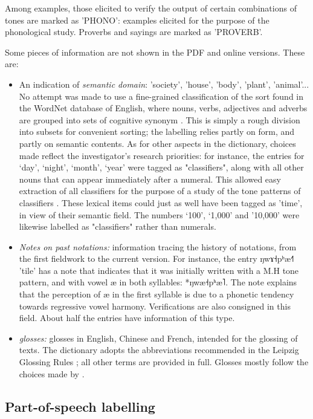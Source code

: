 \documentclass[oldfontcommands,oneside,a4paper,11pt]{article}
\newcommand{\ipa}[1]{{\phon #1}} %
\begin{document}
	Among examples, those elicited to verify the output of certain combinations of tones are marked as 'PHONO': examples elicited for the purpose of the phonological study. Proverbs and sayings are marked as 'PROVERB'.
	
	Some pieces of information are not shown in the PDF and online versions. These are:
	\begin{itemize}
		\item An indication of \textit{semantic domain}: 'society', 'house', 'body', 'plant', 'animal'... No attempt was made to use a fine-grained classification of the sort found in the WordNet database of English, where nouns, verbs, adjectives and adverbs are grouped into sets of cognitive synonym \citep{Fellbaum 2005}. This is simply a rough division into subsets for convenient sorting; the labelling relies partly on form, and partly on semantic contents. As for other aspects in the dictionary, choices made reflect the investigator's research priorities: for instance, the entries for ‘day’, ‘night’, ‘month’, ‘year’ were tagged as "classifiers", along with all other nouns that can appear immediately after a numeral. This allowed easy extraction of all classifiers for the purpose of a study of the tone patterns of classifiers \citep{Michaud2013}. These lexical items could just as well have been tagged as 'time', in view of their semantic field. The numbers ‘100’, ‘1,000’ and ’10,000’ were likewise labelled as "classifiers" rather than numerals.
		\item \textit{Notes on past notations:} information tracing the history of notations, from the first fieldwork to the current version. For instance, the entry \ipa{ŋwɤ˧pʰæ˧˥} 'tile' has a note that indicates that it was initially written with a M.H tone pattern, and with vowel \ipa{æ} in both syllables: *\ipa{ŋwæ˧pʰæ˥}. The note explains that the perception of \ipa{æ} in the first syllable is due to a phonetic tendency towards regressive vowel harmony. Verifications are also consigned in this field. About half the entries have information of this type.
		\item \textit{glosses:} glosses in English, Chinese and French, intended for the glossing of texts. The dictionary adopts the abbreviations recommended in the Leipzig Glossing Rules \citep{Comrie}; all other terms are provided in full. Glosses mostly follow the choices made by \citep{Lidz2010}.
	\end{itemize}
	
	\subsection{Part-of-speech labelling} \label{sec:pos}
	
\end{document}
